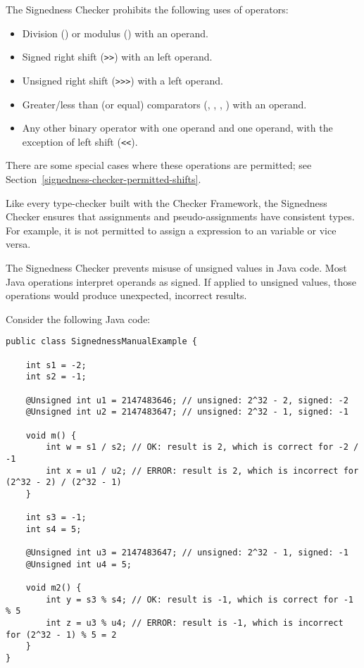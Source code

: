 
The Signedness Checker prohibits the following uses of operators:

\begin{itemize}

    \item
    Division (\code{/}) or modulus (\code{\%}) with an 
    operand.
    \item
    Signed right shift (\verb|>>|) with an  left operand.
    \item
    Unsigned right shift (\verb|>>>|) with a  left operand.
    \item
    Greater/less than (or equal) comparators
    (\code{<}, \code{<=}, \code{>}, \code{>=}) with an 
    operand.
    \item
    Any other binary operator with one  operand and one
     operand, with the exception of left shift (\verb|<<|).

\end{itemize}

There are some special cases where these operations are permitted; see
Section~\ref{signedness-checker-permitted-shifts}.

Like every type-checker built with the Checker Framework, the Signedness
Checker ensures that assignments and pseudo-assignments have consistent types.
For example, it is not permitted to assign a  expression to an
 variable or vice versa.



The Signedness Checker prevents misuse of unsigned values in Java code.
Most Java operations interpret operands as signed.  If applied to unsigned
values, those operations would produce unexpected, incorrect results.

Consider the following Java code:

\begin{Verbatim}
public class SignednessManualExample {

    int s1 = -2;
    int s2 = -1;

    @Unsigned int u1 = 2147483646; // unsigned: 2^32 - 2, signed: -2
    @Unsigned int u2 = 2147483647; // unsigned: 2^32 - 1, signed: -1

    void m() {
        int w = s1 / s2; // OK: result is 2, which is correct for -2 / -1
        int x = u1 / u2; // ERROR: result is 2, which is incorrect for (2^32 - 2) / (2^32 - 1)
    }

    int s3 = -1;
    int s4 = 5;

    @Unsigned int u3 = 2147483647; // unsigned: 2^32 - 1, signed: -1
    @Unsigned int u4 = 5;

    void m2() {
        int y = s3 % s4; // OK: result is -1, which is correct for -1 % 5
        int z = u3 % u4; // ERROR: result is -1, which is incorrect for (2^32 - 1) % 5 = 2
    }
}
\end{Verbatim}


